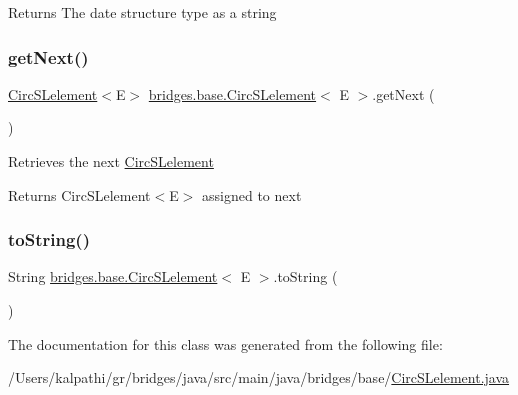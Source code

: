 \begin{DoxyReturn}{Returns}
The date structure type as a string 
\end{DoxyReturn}
\mbox{\label{classbridges_1_1base_1_1_circ_s_lelement_ae18b07e3f1d37b5eca0cae22efc0d395}} 
\subsubsection{\texorpdfstring{getNext()}{getNext()}}
{\footnotesize\ttfamily \mbox{\hyperlink{classbridges_1_1base_1_1_circ_s_lelement}{Circ\+S\+Lelement}}$<$E$>$ \mbox{\hyperlink{classbridges_1_1base_1_1_circ_s_lelement}{bridges.\+base.\+Circ\+S\+Lelement}}$<$ E $>$.get\+Next (\begin{DoxyParamCaption}{ }\end{DoxyParamCaption})}

Retrieves the next \mbox{\hyperlink{classbridges_1_1base_1_1_circ_s_lelement}{Circ\+S\+Lelement}}

\begin{DoxyReturn}{Returns}
Circ\+S\+Lelement$<$\+E$>$ assigned to next 
\end{DoxyReturn}
\mbox{\label{classbridges_1_1base_1_1_circ_s_lelement_af307188926766e73efb988f102ce9740}} 
\subsubsection{\texorpdfstring{toString()}{toString()}}
{\footnotesize\ttfamily String \mbox{\hyperlink{classbridges_1_1base_1_1_circ_s_lelement}{bridges.\+base.\+Circ\+S\+Lelement}}$<$ E $>$.to\+String (\begin{DoxyParamCaption}{ }\end{DoxyParamCaption})}



The documentation for this class was generated from the following file\+:\begin{DoxyCompactItemize}
\item 
/\+Users/kalpathi/gr/bridges/java/src/main/java/bridges/base/\mbox{\hyperlink{_circ_s_lelement_8java}{Circ\+S\+Lelement.\+java}}\end{DoxyCompactItemize}
